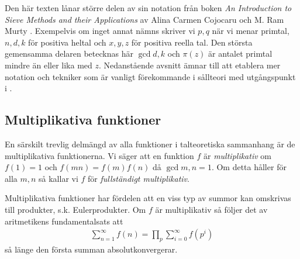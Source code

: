 
Den här texten lånar större delen av sin notation från boken \textit{An Introduction to Sieve Methods and their Applications} av Alina Carmen Cojocaru och M. Ram Murty \cite{cojocarumurty}. Exempelvis om inget annat nämns skriver vi \(p, q\) när vi menar primtal, \(n, d, k\) för positiva heltal och \(x, y, z\) för positiva reella tal. Den största gemensamma delaren betecknas här \(\gcd{d, k}\) och \(\pi(z)\) är antalet primtal mindre än eller lika med \(z\). Nedanstående avsnitt ämnar till att etablera mer notation och tekniker som är vanligt förekommande i sållteori med utgångspunkt i \cite{cojocarumurty}.

\subsection{Multiplikativa funktioner} \label{mult}
En särskilt trevlig delmängd av alla funktioner i talteoretiska sammanhang är de multiplikativa funktionerna. Vi säger att en funktion $f$ är \textit{multiplikativ} om $f(1) = 1$ och \(f(mn) = f(m)f(n)\) då $\gcd{m,n} = 1$. Om detta håller för alla $m, n$ så kallar vi $f$ för \textit{fullständigt multiplikativ}. 

Multiplikativa funktioner har fördelen att en viss typ av summor kan omskrivas till produkter, s.k. Eulerprodukter. Om \(f\) är multiplikativ så följer det av aritmetikens fundamentalsats att
\begin{align*}
    \sum_{n = 1}^\infty f(n) = \prod_p \sum_{i=0}^\infty f(p^i)
\end{align*}
så länge den första summan absolutkonvergerar. 

